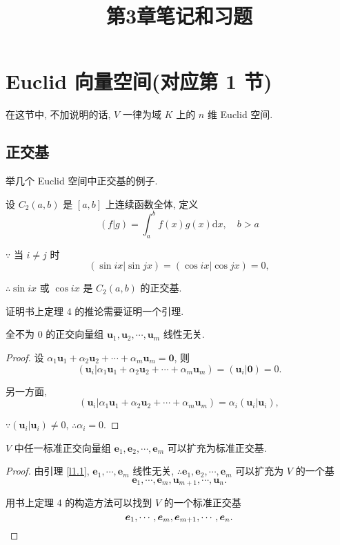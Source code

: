 \documentclass{ctexart}
\title{第3章笔记和习题}
\begin{document}
\maketitle
\section{Euclid 向量空间(对应第 1 节)}
在这节中, 不加说明的话, $V$ 一律为域 $K$ 上的 $n$ 维 Euclid 空间.
\subsection{正交基}
举几个 Euclid 空间中正交基的例子.
\begin{example}
    设 $C_2(a,b)$ 是 $[a,b]$ 上连续函数全体, 定义
    \[(f|g)=\int_a^bf(x)g(x)\mathrm{d}x,\quad b>a\]

    $\because$ 当 $i\neq j$ 时
    \[(\sin ix|\sin jx)=(\cos ix|\cos jx)=0,\]

    $\therefore\sin ix$ 或 $\cos ix$ 是 $C_2(a,b)$ 的正交基.
\end{example}
证明书上定理 4 的推论需要证明一个引理.
\begin{lemma}\label{l1.1}
    全不为 $0$ 的正交向量组 $\boldsymbol{u}_1,\boldsymbol{u}_2,\cdots,\boldsymbol{u}_m$ 线性无关.
\end{lemma}
\begin{proof}
    设 $\alpha_1\boldsymbol{u}_1+\alpha_2\boldsymbol{u}_2+\cdots+\alpha_m\boldsymbol{u}_m=\boldsymbol{0}$, 则
    \[(\boldsymbol{u}_i|\alpha_1\boldsymbol{u}_1+\alpha_2\boldsymbol{u}_2+\cdots+\alpha_m\boldsymbol{u}_m)=(\boldsymbol{u}_i|\boldsymbol{0})=0.\]

    另一方面,
    \[(\boldsymbol{u}_i|\alpha_1\boldsymbol{u}_1+\alpha_2\boldsymbol{u}_2+\cdots+\alpha_m\boldsymbol{u}_m)=\alpha_i(\boldsymbol{u}_i|\boldsymbol{u}_i),\]
    
    $\because(\boldsymbol{u}_i|\boldsymbol{u}_i)\neq0$, $\therefore\alpha_i=0$.
\end{proof}
\begin{theorem}
    $V$ 中任一标准正交向量组 $\boldsymbol{e}_1,\boldsymbol{e}_2,\cdots,\boldsymbol{e}_m$ 可以扩充为标准正交基.
\end{theorem}
\begin{proof}
    由引理 \ref{l1.1}, $\boldsymbol{e}_1,\cdots,\boldsymbol{e}_m$ 线性无关, $\therefore\boldsymbol{e}_1,\boldsymbol{e}_2,\cdots,\boldsymbol{e}_m$ 可以扩充为 $V$ 的一个基
    \[\boldsymbol{e}_1,\cdots,\boldsymbol{e}_m,\boldsymbol{u}_{m+1},\cdots,\boldsymbol{u}_n.\]
    
    用书上定理 4 的构造方法可以找到 $V$ 的一个标准正交基
    \[\boldsymbol{e}_1,\cdots,\boldsymbol{e}_m,\boldsymbol{e}_{m+1},\cdots,\boldsymbol{e}_n.\qedhere\]
\end{proof}
\end{document}
